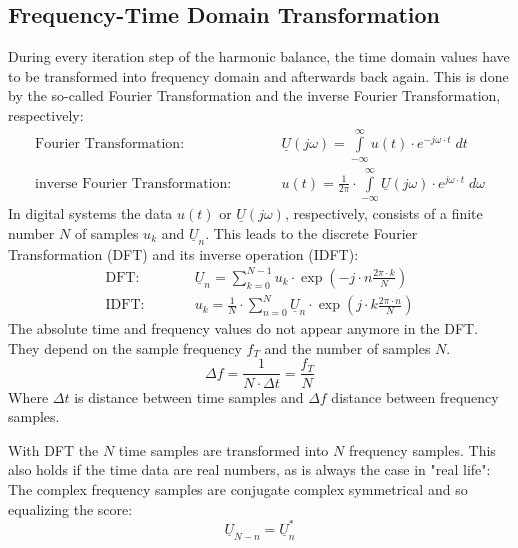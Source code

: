 \subsection{Frequency-Time Domain Transformation}

During every iteration step of the harmonic balance, the time domain
values have to be transformed into frequency domain and afterwards
back again. This is done by the so-called Fourier Transformation and
the inverse Fourier Transformation, respectively:
\begin{eqnarray}
\text{Fourier Transformation:} & \qquad &
     \underline{U}(j\omega) =
     \int\limits_{-\infty}^{\infty} u(t)\cdot e^{-j\omega\cdot t} \; dt \\
\text{inverse Fourier Transformation:} & \qquad &
     u(t) = \frac{1}{2\pi} \cdot \int\limits_{-\infty}^{\infty}
            \underline{U}(j\omega)\cdot e^{j\omega\cdot t} \; d\omega
\end{eqnarray}
In digital systems the data $u(t)$ or $\underline{U}(j\omega)$,
respectively, consists of a finite number $N$ of samples $u_k$ and
$\underline{U}_n$. This leads to the discrete Fourier Transformation
(DFT) and its inverse operation (IDFT):
\begin{eqnarray}
\label{eqn:DFT}
\text{DFT:} & \qquad &
     \underline{U}_n =
     \sum_{k=0}^{N-1} u_k\cdot \exp\left( -j\cdot n\frac{2\pi\cdot k}{N} \right) \\
\label{eqn:IDFT}
\text{IDFT:} & \qquad &
     u_k = \frac{1}{N} \cdot \sum_{n=0}^{N}
            \underline{U}_n\cdot \exp\left( j\cdot k\frac{2\pi\cdot n}{N} \right)
\end{eqnarray}
The absolute time and frequency values do not appear anymore in the DFT.
They depend on the sample frequency $f_T$ and the number of samples $N$.
\begin{equation}
\Delta f = \frac{1}{N\cdot\Delta t} = \frac{f_T}{N}
\end{equation}
Where $\Delta t$ is distance between time samples and $\Delta f$
distance between frequency samples.

\addvspace{12pt}

With DFT the $N$ time samples are transformed into $N$ frequency samples.
This also holds if the time data are real numbers, as is always
the case in "real life": The complex frequency samples are conjugate
complex symmetrical and so equalizing the score:
\begin{equation}
\underline{U}_{N-n} = \underline{U}_n^*
\end{equation}

